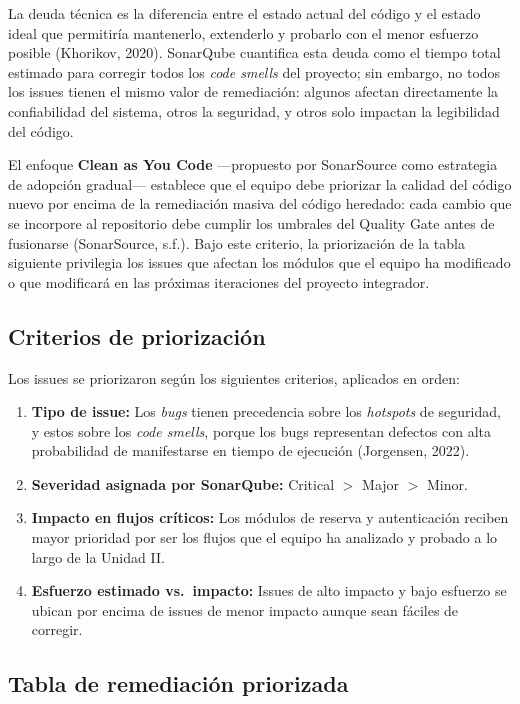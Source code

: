 \documentclass[12pt,letterpaper]{article}
\begin{document}
La deuda técnica es la diferencia entre el estado actual del código y el estado ideal
que permitiría mantenerlo, extenderlo y probarlo con el menor esfuerzo posible
(Khorikov, 2020). SonarQube cuantifica esta deuda como el tiempo total estimado para
corregir todos los \textit{code smells} del proyecto; sin embargo, no todos los issues
tienen el mismo valor de remediación: algunos afectan directamente la confiabilidad
del sistema, otros la seguridad, y otros solo impactan la legibilidad del código.

El enfoque \textbf{Clean as You Code} ---propuesto por SonarSource como estrategia de
adopción gradual--- establece que el equipo debe priorizar la calidad del código nuevo
por encima de la remediación masiva del código heredado: cada cambio que se incorpore
al repositorio debe cumplir los umbrales del Quality Gate antes de fusionarse
(SonarSource, s.f.). Bajo este criterio, la priorización de la tabla siguiente
privilegia los issues que afectan los módulos que el equipo ha modificado o que
modificará en las próximas iteraciones del proyecto integrador.

\subsection{Criterios de priorización}

Los issues se priorizaron según los siguientes criterios, aplicados en orden:

\begin{enumerate}[leftmargin=*]
  \item \textbf{Tipo de issue:} Los \textit{bugs} tienen precedencia sobre los
        \textit{hotspots} de seguridad, y estos sobre los \textit{code smells},
        porque los bugs representan defectos con alta probabilidad de manifestarse
        en tiempo de ejecución (Jorgensen, 2022).
  \item \textbf{Severidad asignada por SonarQube:} Critical $>$ Major $>$ Minor.
  \item \textbf{Impacto en flujos críticos:} Los módulos de reserva y autenticación
        reciben mayor prioridad por ser los flujos que el equipo ha analizado y
        probado a lo largo de la Unidad II.
  \item \textbf{Esfuerzo estimado vs.\ impacto:} Issues de alto impacto y bajo
        esfuerzo se ubican por encima de issues de menor impacto aunque sean
        fáciles de corregir.
\end{enumerate}

\subsection{Tabla de remediación priorizada}
\end{document}
